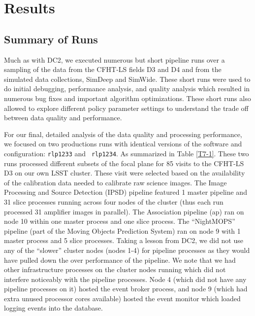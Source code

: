\newcommand{\stc}[1]{\hbox to 2.5em{{#1}\hfil}}

\section{Results}

\subsection{Summary of Runs}

Much as with DC2, we executed numerous but short pipeline runs over
a sampling of the data from the CFHT-LS fields D3 and D4 and from the
simulated data collections, SimDeep and SimWide.  These short runs
were used to do initial debugging, performance analysis, and quality
analysis which resulted in numerous bug fixes and important algorithm
optimizations.  These short runs also allowed to explore different
policy parameter settings to understand the trade off between data
quality and performance.  

For our final, detailed analysis of the data quality and processing
performance, we focused on two productions runs with identical
versions of the software and configuration: {\tt rlp1233} and {\tt
rlp1234}.  As summarized in Table \ref{T7-1}.  These two runs
processed different subsets of the focal plane for 85 visits to the
CFHT-LS D3 on our own LSST cluster.  These visit were selected based
on the availability of the calibration data needed to calibrate raw
science images.  The Image Processing and Source Detection (IPSD)
pipeline featured 1 master pipeline and 31 slice processes running
across four nodes of the cluster (thus each run processed 31 amplifier
images in parallel).  The Association pipeline (ap) ran on node 10
within one master process and one slice process.  The ``NightMOPS''
pipeline (part of the Moving Objects Prediction System) ran on node 9
with 1 master process and 5 slice processes.  Taking a lesson from
DC2, we did not use any of the ``slower'' cluster nodes (nodes 1-4)
for pipeline processes as they would have pulled down the over
performance of the pipeline.  We note that we had other infrastructure
processes on the cluster nodes running which did not interfere
noticeably with the pipeline processes.  Node 4 (which did not have
any pipeline processes on it) hosted the event broker process, and
node 9 (which had extra unused processor cores available) hosted the
event monitor which loaded logging events into the database.

